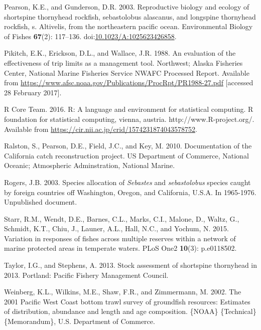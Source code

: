 \documentclass[11pt,
  english,
  letterpaper,
]{article}
\newlength{\cslhangindent}
\newenvironment{CSLReferences}[2] %
 {%
  \setlength{\parindent}{0pt}
  \ifodd #1 \everypar{\setlength{\hangindent}{\cslhangindent}}\ignorespaces\fi
  \ifnum #2 > 0
  \setlength{\parskip}{#2\baselineskip}
  \fi
 }%
 {}
\begin{document}
\begin{CSLReferences}{1}{0}
\leavevmode{}%
Pearson, K.E., and Gunderson, D.R. 2003. Reproductive biology and ecology of shortspine thornyhead rockfish, sebastolobus alascanus, and longspine thornyhead rockfish, s. Altivelis, from the northeastern pacific ocean. Environmental Biology of Fishes \textbf{67}(2): 117--136. doi:\href{https://doi.org/10.1023/A:1025623426858}{10.1023/A:1025623426858}.

\leavevmode{}%
Pikitch, E.K., Erickson, D.L., and Wallace, J.R. 1988. An evaluation of the effectiveness of trip limits as a management tool. Northwest; Alaska Fisheries Center, National Marine Fisheries Service NWAFC Processed Report. Available from \url{https://www.afsc.noaa.gov/Publications/ProcRpt/PR1988-27.pdf} {[}accessed 28 February 2017{]}.

\leavevmode{}%
R Core Team. 2016. R: A language and environment for statistical computing. R foundation for statistical computing, vienna, austria. http://www.R-project.org/. Available from \url{https://cir.nii.ac.jp/crid/1574231874043578752}.

\leavevmode{}%
Ralston, S., Pearson, D.E., Field, J.C., and Key, M. 2010. Documentation of the {California} catch reconstruction project. US Department of Commerce, National Oceanic; Atmospheric Adminstration, National Marine.

\leavevmode{}%
Rogers, J.B. 2003. Species allocation of \emph{{Sebastes}} and \emph{sebastolobus} species caught by foreign countries off {Washington}, {Oregon}, and {California}, {U}.{S}.{A}. In 1965-1976. Unpublished document.

\leavevmode{}%
Starr, R.M., Wendt, D.E., Barnes, C.L., Marks, C.I., Malone, D., Waltz, G., Schmidt, K.T., Chiu, J., Launer, A.L., Hall, N.C., and Yochum, N. 2015. Variation in responses of fishes across multiple reserves within a network of marine protected areas in temperate waters. PLoS One2 \textbf{10}(3): p.e0118502.

\leavevmode{}%
Taylor, I.G., and Stephens, A. 2013. Stock assessment of shortspine thornyhead in 2013. Portland: Pacific Fishery Management Council.

\leavevmode{}%
Weinberg, K.L., Wilkins, M.E., Shaw, F.R., and Zimmermann, M. 2002. The 2001 {Pacific} {West} {Coast} bottom trawl survey of groundfish resources: Estimates of distribution, abundance and length and age composition. \{NOAA\} \{Technical\} \{Memorandum\}, U.S. Department of Commerce.


\end{CSLReferences}
\end{document}
